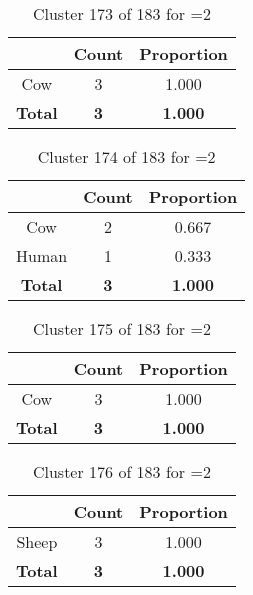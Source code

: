 \begin{table}[ht!]
\centering
\begin{tabular}{|c|c|c|}
\hline
\bf \Spec{} &\bf Count &\bf Proportion\\ \hline \hline
Cow & 3 & 1.000\\ \hline
\hline
\bf Total & \bf 3 & \bf 1.000\\ \hline
\end{tabular}
\label{tab:cluster:173:2}
\caption{Cluster 173 of 183 for \minneigh{}=2}
\end{table}

\begin{table}[ht!]
\centering
\begin{tabular}{|c|c|c|}
\hline
\bf \Spec{} &\bf Count &\bf Proportion\\ \hline \hline
Cow & 2 & 0.667\\ \hline
Human & 1 & 0.333\\ \hline
\hline
\bf Total & \bf 3 & \bf 1.000\\ \hline
\end{tabular}
\label{tab:cluster:174:2}
\caption{Cluster 174 of 183 for \minneigh{}=2}
\end{table}

\begin{table}[ht!]
\centering
\begin{tabular}{|c|c|c|}
\hline
\bf \Spec{} &\bf Count &\bf Proportion\\ \hline \hline
Cow & 3 & 1.000\\ \hline
\hline
\bf Total & \bf 3 & \bf 1.000\\ \hline
\end{tabular}
\label{tab:cluster:175:2}
\caption{Cluster 175 of 183 for \minneigh{}=2}
\end{table}

\begin{table}[ht!]
\centering
\begin{tabular}{|c|c|c|}
\hline
\bf \Spec{} &\bf Count &\bf Proportion\\ \hline \hline
Sheep & 3 & 1.000\\ \hline
\hline
\bf Total & \bf 3 & \bf 1.000\\ \hline
\end{tabular}
\label{tab:cluster:176:2}
\caption{Cluster 176 of 183 for \minneigh{}=2}
\end{table}


